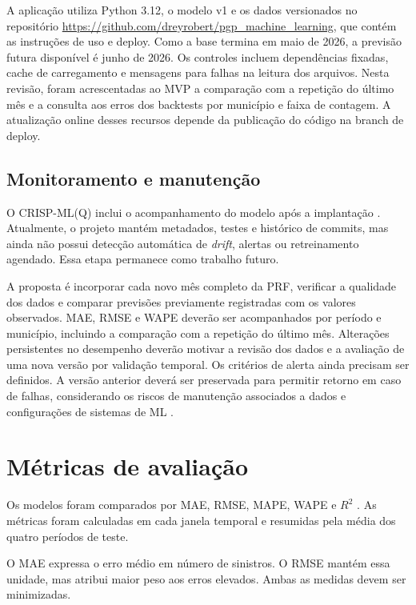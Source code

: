 \documentclass[12pt]{article}
\begin{document}
A aplicação utiliza Python 3.12, o modelo v1 e os dados versionados no repositório \url{https://github.com/dreyrobert/pgp_machine_learning}, que contém as instruções de uso e deploy. Como a base termina em maio de 2026, a previsão futura disponível é junho de 2026. Os controles incluem dependências fixadas, cache de carregamento e mensagens para falhas na leitura dos arquivos. Nesta revisão, foram acrescentadas ao MVP a comparação com a repetição do último mês e a consulta aos erros dos backtests por município e faixa de contagem. A atualização online desses recursos depende da publicação do código na branch de deploy.

\subsection{Monitoramento e manutenção}

O CRISP-ML(Q) inclui o acompanhamento do modelo após a implantação \cite{studer2021crispmlq}. Atualmente, o projeto mantém metadados, testes e histórico de commits, mas ainda não possui detecção automática de \textit{drift}, alertas ou retreinamento agendado. Essa etapa permanece como trabalho futuro.

A proposta é incorporar cada novo mês completo da PRF, verificar a qualidade dos dados e comparar previsões previamente registradas com os valores observados. MAE, RMSE e WAPE deverão ser acompanhados por período e município, incluindo a comparação com a repetição do último mês. Alterações persistentes no desempenho deverão motivar a revisão dos dados e a avaliação de uma nova versão por validação temporal. Os critérios de alerta ainda precisam ser definidos. A versão anterior deverá ser preservada para permitir retorno em caso de falhas, considerando os riscos de manutenção associados a dados e configurações de sistemas de ML \cite{sculley2015debt}.

\section{Métricas de avaliação}
\label{sec:metricas}

Os modelos foram comparados por MAE, RMSE, MAPE, WAPE e $R^2$ \cite{hyndman2006measures}. As métricas foram calculadas em cada janela temporal e resumidas pela média dos quatro períodos de teste.

O MAE expressa o erro médio em número de sinistros. O RMSE mantém essa unidade, mas atribui maior peso aos erros elevados. Ambas as medidas devem ser minimizadas.
\end{document}
